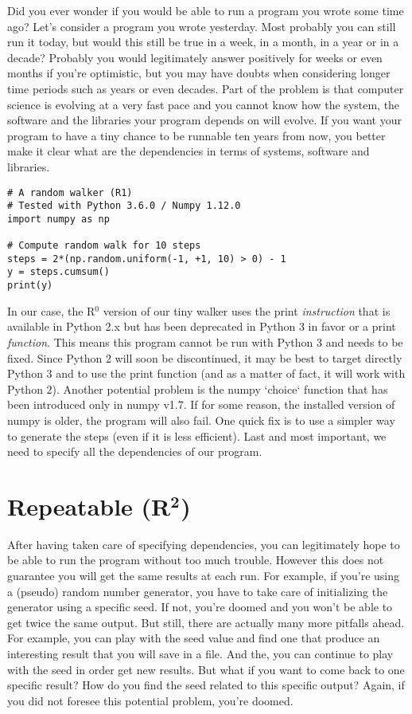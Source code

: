 \documentclass[a4paper,11pt]{article}
\begin{document}
Did you ever wonder if you would be able to run a program you wrote some time
ago? Let's consider a program you wrote yesterday. Most probably you can still
run it today, but would this still be true in a week, in a month, in a year or
in a decade? Probably you would legitimately answer positively for weeks
or even months if you're optimistic, but you may have doubts when considering
longer time periods such as years or even decades. Part of the problem is that
computer science is evolving at a very fast pace and you cannot know how the
system, the software and the libraries your program depends on will evolve.
If you want your program to have a tiny chance to be runnable ten years from
now, you better make it clear what are the dependencies in terms of systems,
software and libraries.\\
\cite{Collberg:2016}

\begin{lstlisting}
# A random walker (R1)
# Tested with Python 3.6.0 / Numpy 1.12.0
import numpy as np

# Compute random walk for 10 steps
steps = 2*(np.random.uniform(-1, +1, 10) > 0) - 1
y = steps.cumsum()
print(y)
\end{lstlisting}

In our case, the R$^0$ version of our tiny walker uses the print {\em instruction} that is available in Python 2.x but has been deprecated in Python 3 in favor or a  print {\em function}.
This means this program cannot be run with Python 3 and needs to be fixed.
Since Python 2 will soon be discontinued, it may be best to target directly Python 3 and to use the print function (and as a matter of fact, it will work with Python 2).
Another potential problem is the numpy `choice` function that has been introduced only in numpy v1.7.
If for some reason, the installed version of numpy is older, the program will also fail.
One quick fix is to use a simpler way to generate the steps (even if it is less efficient).
Last and most important, we need to specify all the dependencies of our program.


\clearpage
\section*{Repeatable (R$^{\mathbf 2}$)}

After having taken care of specifying dependencies, you can legitimately hope to be able to run the program without too much trouble.
However this does not guarantee you will get the same results at each run.
For example, if you're using a (pseudo) random number generator, you have to take care of initializing the generator using a specific seed.
If not, you're doomed and you won't be able to get twice the same output. But still, there are actually many more pitfalls ahead.
For example, you can play with the seed value and find one that produce an interesting result that you will save in a file.
And the, you can continue to play with the seed in order get new results.
But what if you want to come back to one specific result?
How do you find the seed related to this specific output?
Again, if you did not foresee this potential problem, you're doomed.\\
\end{document}
